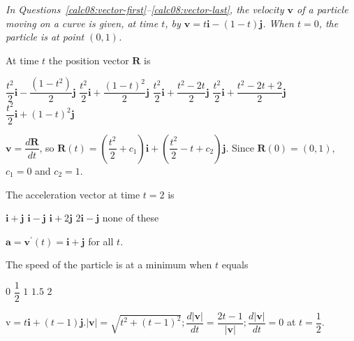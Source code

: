 \begin{EnvFullwidth}
\textit{In Questions~\ref{calc08:vector-first}--\ref{calc08:vector-last}, the velocity $\mathbf{v}$ of a particle moving on a curve is given, at time $t$, by $\mathbf{v}=t \mathbf{i}-(1-t) \mathbf{j}$. When $t=0$, the particle is at point $(0,1)$.}
\end{EnvFullwidth}

\question\label{calc08:vector-first}
At time $t$ the position vector $\mathbf{R}$ is
\begin{choices}
  \choice $\dfrac{t^{2}}{2} \mathbf{i}-\dfrac{\left(1-t^{2}\right)}{2} \mathbf{j}$
  \choice $\dfrac{t^{2}}{2} \mathbf{i}+\dfrac{(1-t)^{2}}{2} \mathbf{j}$
  \choice $\dfrac{t^{2}}{2} \mathbf{i}+\dfrac{t^{2}-2 t}{2} \mathbf{j}$
  \CorrectChoice $\dfrac{t^{2}}{2} \mathbf{i}+\dfrac{t^{2}-2 t+2}{2} \mathbf{j}$
  \choice $\dfrac{t^{2}}{2} \mathbf{i}+(1-t)^{2} \mathbf{j}$
\end{choices}
\begin{solution}
$\mathbf{v}=\dfrac{d \mathbf{R}}{d t}$, so $\mathbf{R}(t)=\left(\dfrac{t^{2}}{2}+c_{1}\right) \mathbf{i}+\left(\dfrac{t^{2}}{2}-t+c_{2}\right) \mathbf{j}$. Since $\mathbf{R}(0)=(0,1)$, $c_{1}=0$ and $c_{2}=1$.
\end{solution}

\question
The acceleration vector at time $t=2$ is
\begin{choices}
  \CorrectChoice $\mathbf{i}+\mathbf{j}$
  \choice $\mathbf{i}-\mathbf{j}$
  \choice $\mathbf{i}+2 \mathbf{j}$
  \choice $2 \mathbf{i}-\mathbf{j}$
  \choice none of these
\end{choices}
\begin{solution}
$\mathbf{a}=\mathbf{v}^{\prime}(t)=\mathbf{i}+\mathbf{j}$ for all $t$.
\end{solution}



\newpage



\question\label{calc08:vector-last}
The speed of the particle is at a minimum when $t$ equals
\begin{choices}
  \choice $0$
  \CorrectChoice $\dfrac{1}{2}$
  \choice $1$
  \choice $1.5$
  \choice $2$
\end{choices}
\begin{solution}
$\mathrm{v}=t \mathbf{i}+(t-1) \mathbf{j} .|\mathbf{v}|=\sqrt{t^{2}+(t-1)^{2}} ; \dfrac{d|\mathbf{v}|}{d t}=\dfrac{2 t-1}{|\mathbf{v}|} ; \dfrac{d|\mathbf{v}|}{d t}=0$ at $t=\dfrac{1}{2}$.
\end{solution}

